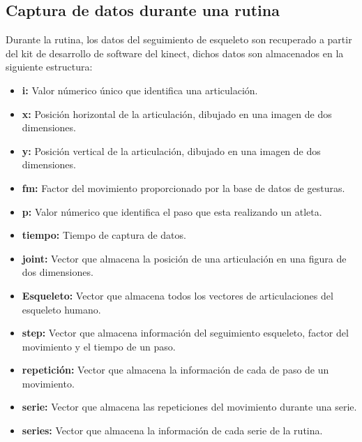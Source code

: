 \subsection{Captura de datos durante una rutina}\label{dis:recognitionMove}
Durante la rutina, los datos del seguimiento de esqueleto son recuperado a partir del kit de desarrollo de software del kinect, dichos datos son almacenados en la siguiente estructura:
\begin{itemize}
\item \textbf{i:} Valor n\'umerico \'unico que identifica una articulaci\'on.
\item \textbf{x:} Posici\'on horizontal de la articulaci\'on, dibujado en una imagen de dos dimensiones.
\item \textbf{y:} Posici\'on vertical de la articulaci\'on, dibujado en una imagen de dos dimensiones.
\item \textbf{fm:} Factor del movimiento proporcionado por la base de datos de gesturas.
\item \textbf{p:} Valor n\'umerico que identifica el paso que esta realizando un atleta.
\item \textbf{tiempo:} Tiempo de captura de datos.
\item \textbf{joint:} Vector que almacena la posici\'on de una articulaci\'on en una figura de dos dimensiones.
\item \textbf{Esqueleto:} Vector que almacena todos los vectores de articulaciones del esqueleto humano.
\item \textbf{step:} Vector que almacena informaci\'on del seguimiento esqueleto, factor del movimiento y el tiempo de un paso.
\item \textbf{repetici\'on:} Vector que almacena la informaci\'on de cada de paso de un movimiento.
\item \textbf{serie:} Vector que almacena las repeticiones del movimiento durante una serie.
\item \textbf{series:} Vector que almacena la informaci\'on de cada serie de la rutina.
\end{itemize}
